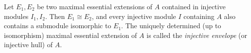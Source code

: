 Let $E_1, E_2$ be two maximal essential extensions of $A$ contained in injective modules $I_1, I_2$. Then $E_1 \cong E_2$, and every injective module $I$ containing $A$ also contains a submodule isomorphic to $E_1$. The uniquely determined (up to isomorphism) maximal essential extension of $A$ is called the \emph{injective envelope} (or injective hull) of $A$.